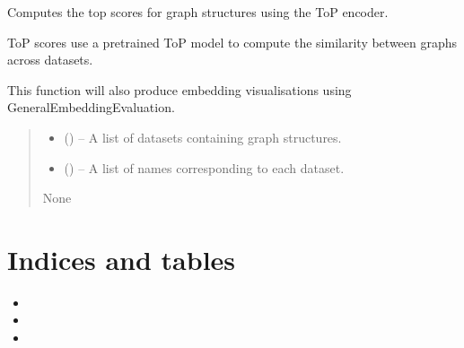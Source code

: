 \documentclass[letterpaper,10pt,english]{sphinxhowto}
\begin{document}

\begin{fulllineitems}
\label{\detokenize{top:top.compute_top_scores}}
\pysigstartsignatures
{}
\pysigstopsignatures
\sphinxAtStartPar
Computes the top scores for graph structures using the ToP encoder.

\sphinxAtStartPar
ToP scores use a pre\sphinxhyphen{}trained ToP model to compute the similarity between graphs across datasets.

\sphinxAtStartPar
This function will also produce embedding visualisations using GeneralEmbeddingEvaluation.
\begin{quote}\begin{description}
\begin{itemize}
\item {} 
\sphinxAtStartPar
{} () – A list of datasets containing graph structures.

\item {} 
\sphinxAtStartPar
{} () – A list of names corresponding to each dataset.

\end{itemize}

\sphinxAtStartPar
None

\end{description}\end{quote}

\end{fulllineitems}



\section{Indices and tables}
\label{\detokenize{index:indices-and-tables}}\begin{itemize}
\item {} 
\sphinxAtStartPar
{}

\item {} 
\sphinxAtStartPar
{}

\item {} 
\sphinxAtStartPar
{}

\end{itemize}
\end{document}
